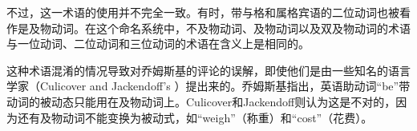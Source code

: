 不过，这一术语的使用并不完全一致。有时，带与格和属格宾语的二位动词也被看作是及物动词。在这个命名系统中，不及物动词、及物动词以及双及物动词的术语与一位动词、二位动词和三位动词的术语在含义上是相同的。

这种术语混淆的情况导致对乔姆斯基的评论的误解，即使他们是由一些知名的语言学家（Culicover and Jackendoff's \citeyearpar[]{CJ2005a}）提出来的。乔姆斯基指出，英语助动词“be”带动词的被动态只能用在及物动词上。Culicover和Jackendoff则认为这是不对的，因为还有及物动词不能变换为被动式，如“weigh”（称重）和“cost”（花费）。 
\eal
{}
\zl

